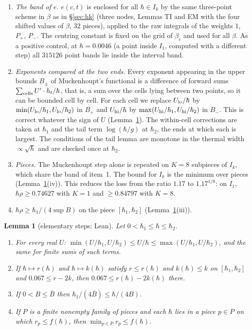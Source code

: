 \documentclass[11pt,a4paper]{article}
\newtheorem{lemma}[theorem]{Lemma}
\theoremstyle{definition}
\theoremstyle{remark}
\newcommand{\hr}{\hbar\rho}
\begin{document}
\begin{enumerate}[leftmargin=2em]
\item \emph{The band of $e$.} $e(c,t)$ is enclosed for all $\hbar\in I_k$ by the same three-point scheme in $\beta$ as in \S\ref{sec:hk} (three nodes, Lemmas TI and EM with the four shifted values of $\beta$, $32$ pieces), applied to the raw integrals of the weights $1$, $P_+$, $P_-$. The centring constant is fixed on the grid of $\beta_c$ and used for all $\beta$. As a positive control, at $\hbar=0.0046$ (a point inside $I_1$, computed with a different step) all $315126$ point bands lie inside the interval band.
\item \emph{Exponents compared at the two ends.} Every exponent appearing in the upper bounds $B_\pm$ of Muckenhoupt's functional is a difference of forward sums $\sum_{\rm cells}U'\cdot h_t/\hbar$, that is, a sum over the cells lying between two points, so it can be bounded cell by cell. For each cell we replace $U_{\rm lo}/\hbar$ by $\min(U_{\rm lo}/\hbar_1,U_{\rm lo}/\hbar_2)$ in $B_+$ and $U_{\rm hi}/\hbar$ by $\max(U_{\rm hi}/\hbar_1,U_{\rm hi}/\hbar_2)$ in $B_-$. This is correct whatever the sign of $U$ (Lemma~\ref{lem:cell}). The within-cell corrections are taken at $\hbar_1$ and the tail term $\log(\hbar/g)$ at $\hbar_2$, the ends at which each is largest. The conditions of the tail lemma are monotone in the thermal width $\propto\sqrt\hbar$ and are checked once at $\hbar_2$.
\item \emph{Pieces.} The Muckenhoupt step alone is repeated on $K=8$ subpieces of $I_k$, which share the band of item~1. The bound for $I_k$ is the minimum over pieces (Lemma~\ref{lem:cell}(iv)). This reduces the loss from the ratio $1.17$ to $1.17^{1/8}$: on $I_1$, $\hr\ge0.74627$ with $K=1$ and $\ge0.84797$ with $K=8$.
\item $\hr\ge\hbar_1/(4\sup B)$ on the piece $[\hbar_1,\hbar_2]$ (Lemma~\ref{lem:cell}(iii)).
\end{enumerate}

\begin{lemma}[elementary steps; Lean]\label{lem:cell}
Let $0<\hbar_1\le\hbar\le\hbar_2$.
\begin{enumerate}[label=(\roman*),leftmargin=2em]
\item For every real $U$: $\min(U/\hbar_1,U/\hbar_2)\le U/\hbar\le\max(U/\hbar_1,U/\hbar_2)$, and the same for finite sums of such terms.
\item If $\hbar\mapsto r(\hbar)$ and $\hbar\mapsto k(\hbar)$ satisfy $r\le r(\hbar)$ and $k(\hbar)\le k$ on $[\hbar_1,\hbar_2]$ and $0.067\le r-2k$, then $0.067\le r(\hbar)-2k(\hbar)$ there.
\item If $0<B\le\bar B$ then $\hbar_1/(4\bar B)\le\hbar/(4B)$.
\item If $P$ is a finite nonempty family of pieces and each $\hbar$ lies in a piece $p\in P$ on which $r_p\le f(\hbar)$, then $\min_{p\in P}r_p\le f(\hbar)$.
\end{enumerate}
\end{lemma}
\end{document}
